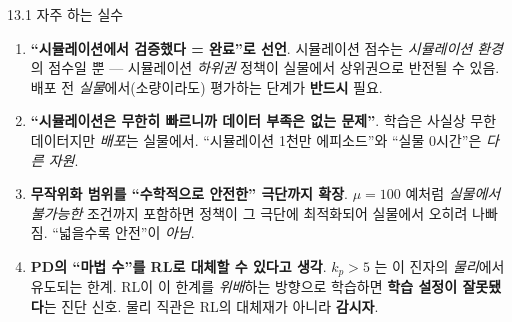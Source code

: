 \begin{frame}{13.1 자주 하는 실수}
  \begin{enumerate}
    \item \textbf{``시뮬레이션에서 검증했다 = 완료''로 선언}.
      시뮬레이션 점수는 \emph{시뮬레이션 환경}의 점수일 뿐 --- 시뮬레이션
      \emph{하위권} 정책이 실물에서 상위권으로 반전될 수 있음. 배포 전
      \emph{실물}에서(소량이라도) 평가하는 단계가 \textbf{반드시} 필요.
    \item \textbf{``시뮬레이션은 무한히 빠르니까 데이터 부족은 없는
      문제''}. 학습은 사실상 무한 데이터지만 \emph{배포}는 실물에서.
      ``시뮬레이션 1천만 에피소드''와 ``실물 0시간''은 \emph{다른 자원}.
    \item \textbf{무작위화 범위를 ``수학적으로 안전한'' 극단까지 확장}.
      $\mu = 100$ 예처럼 \emph{실물에서 불가능한} 조건까지 포함하면 정책이
      그 극단에 최적화되어 실물에서 오히려 나빠짐. ``넓을수록 안전''이
      \emph{아님}.
    \item \textbf{PD의 ``마법 수''를 RL로 대체할 수 있다고 생각}.
      $k_p > 5$ 는 이 진자의 \emph{물리}에서 유도되는 한계. RL이 이 한계를
      \emph{위배}하는 방향으로 학습하면 \textbf{학습 설정이 잘못됐다}는
      진단 신호. 물리 직관은 RL의 대체재가 아니라 \textbf{감시자}.
  \end{enumerate}
\end{frame}

